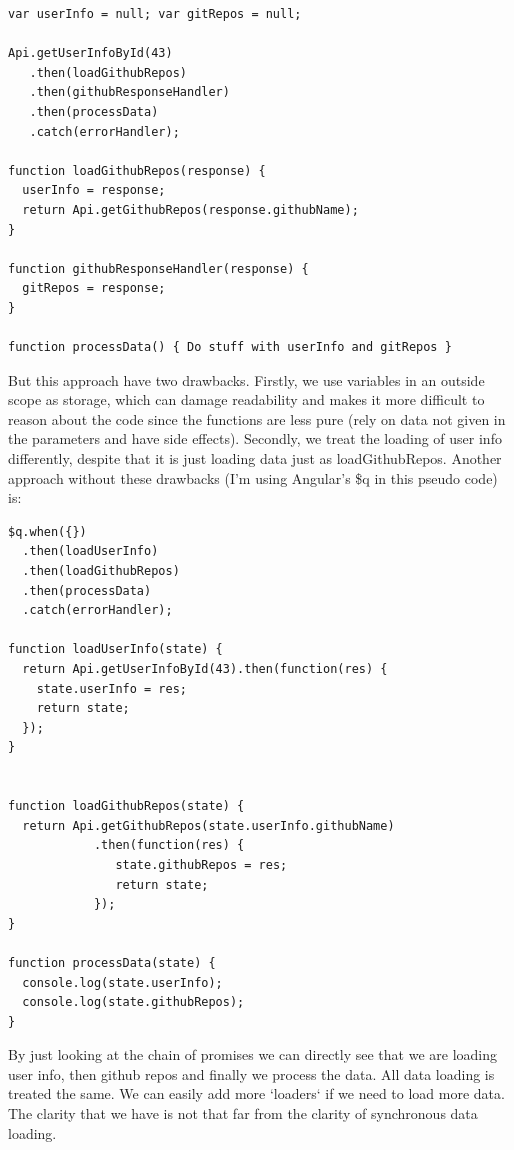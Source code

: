 \documentclass[a4paper,12pt]{article}
\begin{document}
\begin{lstlisting}[caption={Code where we chain promises together and separate data loading from data processing. However, note that we use variables in the scope outside where we load our data.}, frame=single]
var userInfo = null; var gitRepos = null;

Api.getUserInfoById(43)
   .then(loadGithubRepos)
   .then(githubResponseHandler)
   .then(processData)
   .catch(errorHandler);

function loadGithubRepos(response) {
  userInfo = response;
  return Api.getGithubRepos(response.githubName);
}

function githubResponseHandler(response) {
  gitRepos = response;
}

function processData() { Do stuff with userInfo and gitRepos }
\end{lstlisting}
But this approach have two drawbacks. Firstly, we use variables in an outside scope as storage, which can damage readability and makes it more difficult to reason about the code since the functions are less pure (rely on data not given in the parameters and have side effects).
Secondly, we treat the loading of user info differently, despite that it is just loading data just as loadGithubRepos.
Another approach without these drawbacks (I'm using Angular's \$q in this pseudo code) is:
\clearpage
\begin{lstlisting}[caption={Code where we are using promises and have separated data loading from data processing as well as made it very clear what data we are loading}, frame=single]
$q.when({})
  .then(loadUserInfo)
  .then(loadGithubRepos)
  .then(processData)
  .catch(errorHandler);

function loadUserInfo(state) {
  return Api.getUserInfoById(43).then(function(res) {
    state.userInfo = res;
    return state;
  });
}


function loadGithubRepos(state) {
  return Api.getGithubRepos(state.userInfo.githubName)
            .then(function(res) {
               state.githubRepos = res;
               return state;
            });
}

function processData(state) {
  console.log(state.userInfo);
  console.log(state.githubRepos);
}
\end{lstlisting}
By just looking at the chain of promises we can directly see that we are loading user info, then github repos and finally we process the data.
All data loading is treated the same. We can easily add more `loaders` if we need to load more data. The clarity that we have is not that far from the clarity of synchronous data loading.
\end{document}

